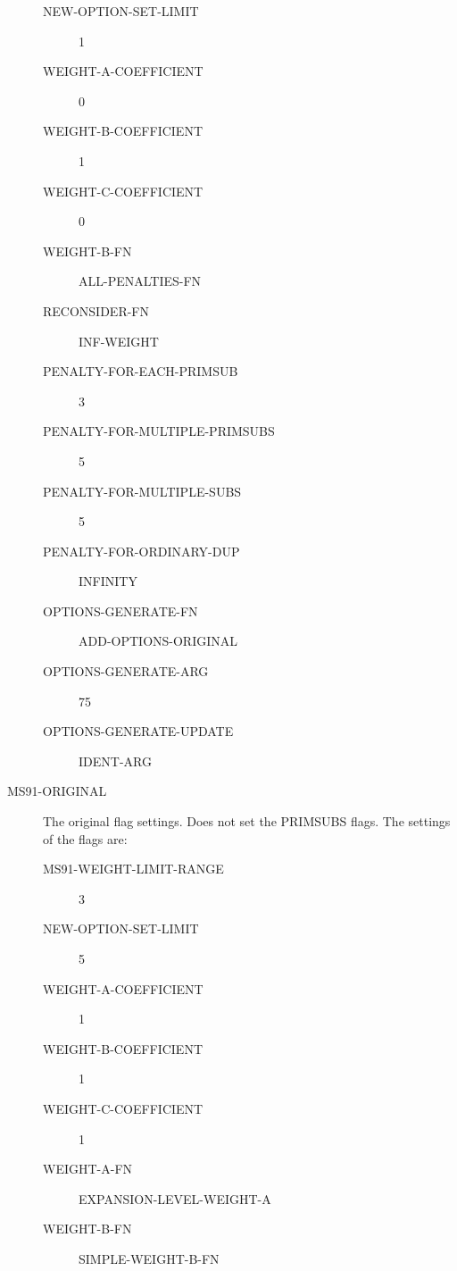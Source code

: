 \begin{description}
\begin{description}
\item[NEW-OPTION-SET-LIMIT] 1

\item[WEIGHT-A-COEFFICIENT] 0

\item[WEIGHT-B-COEFFICIENT] 1

\item[WEIGHT-C-COEFFICIENT] 0

\item[WEIGHT-B-FN] ALL-PENALTIES-FN

\item[RECONSIDER-FN] INF-WEIGHT

\item[PENALTY-FOR-EACH-PRIMSUB] 3

\item[PENALTY-FOR-MULTIPLE-PRIMSUBS] 5

\item[PENALTY-FOR-MULTIPLE-SUBS] 5

\item[PENALTY-FOR-ORDINARY-DUP] INFINITY

\item[OPTIONS-GENERATE-FN] ADD-OPTIONS-ORIGINAL

\item[OPTIONS-GENERATE-ARG] 75

\item[OPTIONS-GENERATE-UPDATE] IDENT-ARG

\end{description}

\item[MS91-ORIGINAL]  
The original flag settings. Does not set the PRIMSUBS flags. The settings of the flags are:
\begin{description}
\item[MS91-WEIGHT-LIMIT-RANGE] 3

\item[NEW-OPTION-SET-LIMIT] 5

\item[WEIGHT-A-COEFFICIENT] 1

\item[WEIGHT-B-COEFFICIENT] 1

\item[WEIGHT-C-COEFFICIENT] 1

\item[WEIGHT-A-FN] EXPANSION-LEVEL-WEIGHT-A

\item[WEIGHT-B-FN] SIMPLE-WEIGHT-B-FN


\end{description}
\end{description}
